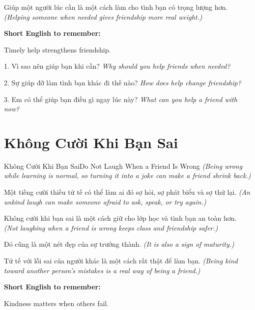 \begin{baihoc}
Giúp một người lúc cần là một cách làm cho tình bạn có trọng lượng hơn.
\textit{(Helping someone when needed gives friendship more real weight.)}
\end{baihoc}

\begin{ghinhoanh}
\textbf{Short English to remember:}

Timely help strengthens friendship.

\end{ghinhoanh}

\begin{tuhocnhanh}
1. Vì sao nên giúp bạn khi cần? \textit{Why should you help friends when needed?}

2. Sự giúp đỡ làm tình bạn khác đi thế nào? \textit{How does help change friendship?}

3. Em có thể giúp bạn điều gì ngay lúc này? \textit{What can you help a friend with now?}
\end{tuhocnhanh}
\ngancach

\section{Không Cười Khi Bạn Sai}
\begin{truyen}{Không Cười Khi Bạn Sai}{Do Not Laugh When a Friend Is Wrong}
\textit{(Being wrong while learning is normal, so turning it into a joke can make a friend shrink back.)}

Một tiếng cười thiếu tử tế có thể làm ai đó sợ hỏi, sợ phát biểu và sợ thử lại.
\textit{(An unkind laugh can make someone afraid to ask, speak, or try again.)}

Không cười khi bạn sai là một cách giữ cho lớp học và tình bạn an toàn hơn.
\textit{(Not laughing when a friend is wrong keeps class and friendship safer.)}

Đó cũng là một nét đẹp của sự trưởng thành.
\textit{(It is also a sign of maturity.)}
\end{truyen}

\begin{baihoc}
Tử tế với lỗi sai của người khác là một cách rất thật để làm bạn.
\textit{(Being kind toward another person's mistakes is a real way of being a friend.)}
\end{baihoc}

\begin{ghinhoanh}
\textbf{Short English to remember:}

Kindness matters when others fail.

\end{ghinhoanh}

